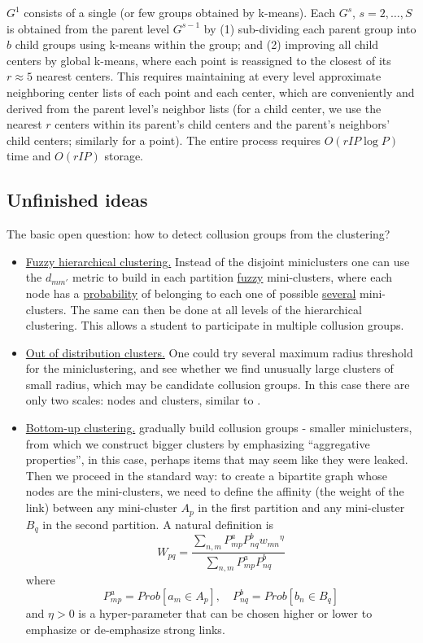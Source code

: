 \documentclass{article}
\begin{document}
$G^1$ consists of a single (or few groups obtained by k-means). Each $G^s$, $s=2,\dots,S$ is obtained from the parent level $G^{s-1}$ by (1) sub-dividing each parent group into $b$ child groups using k-means within the group; and (2) improving all child centers by global k-means, where each point is reassigned to the closest of its $r \approx 5$ nearest centers. This requires maintaining at every level approximate neighboring center lists of each point and each center, which are conveniently and derived from the parent level's neighbor lists (for a child center, we use the nearest $r$ centers within its parent's child centers and the parent's neighbors' child centers; similarly for a point). The entire process requires $O(r I P \log P)$ time and $O(r I P)$ storage.

\subsection{Unfinished ideas}
The basic open question: how to detect collusion groups from the clustering?
\begin{itemize}
	\item \underline{Fuzzy hierarchical clustering.} Instead of the disjoint miniclusters one can use the $d_{mm'}$ metric to build in each partition \underline{fuzzy} mini-clusters, where each node has a \underline{probability} of belonging to each one of possible \underline{several} mini-clusters. The same can then be done at all levels of the hierarchical clustering. This allows a student to participate in multiple collusion groups.
	\item \underline{Out of distribution clusters.} One could try several maximum radius threshold for the miniclustering, and see whether we find unusually large clusters of small radius, which may be candidate collusion groups. In this case there are only two scales: nodes and clusters, similar to \cite{primal}.
  \item \underline{Bottom-up clustering.} gradually build collusion groups - smaller miniclusters, from which we construct bigger clusters by emphasizing ``aggregative properties'', in this case, perhaps items that may seem like they were leaked. Then we proceed in the standard way: to create a bipartite graph whose nodes are the mini-clusters, we need to define  the affinity (the weight of the link) between any mini-cluster $A_p$ in the first partition and any mini-cluster $B_q$ in the second partition. A natural definition is
\begin{equation}
W_{pq} = \frac{\sum_{n,m} P^a_{mp}P^b_{nq}{w_{mn}}^\eta}{ \sum_{n,m}P^a_{mp}P^b_{nq}}
\label{eqn:b2}
\end{equation}
where
\begin{equation}
P^a_{mp} = Prob \left[a_m \in A_p\right], \quad P^b_{nq} = Prob \left[ b_n \in B_q \right]
\end{equation}
and $\eta>0$ is a hyper-parameter that can be chosen higher or lower to emphasize or de-emphasize strong links.
\end{itemize}
\end{document}
